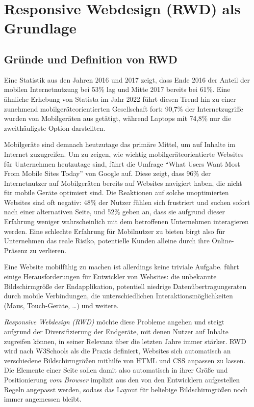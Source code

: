 \section{Responsive Webdesign (RWD) als Grundlage}\label{sec:responsive-webdesign-rwd-als-grundlage}

\subsection{Gründe und Definition von RWD}\label{subsec:grunde-und-definition-von-rwd}

Eine Statistik aus den Jahren 2016 und 2017 \autocite{statista.GWI.2017} zeigt, dass Ende 2016 der Anteil der mobilen Internetnutzung bei 53\% lag und Mitte 2017 bereits bei 61\%.
Eine ähnliche Erhebung von Statista \autocite{statista.DataReportal.WeAreSocial.Hootsuite.2023} im Jahr 2022 führt diesen Trend hin zu einer zunehmend mobilgeräteorientierten Gesellschaft fort:
90,7\% der Internetzugriffe wurden von Mobilgeräten aus getätigt, während Laptops mit 74,8\% nur die zweithäufigste Option darstellten.

Mobilgeräte sind demnach heutzutage das primäre Mittel, um auf Inhalte im Internet zuzugreifen.
Um zu zeigen, wie wichtig mobilgeräteorientierte Websites für Unternehmen heutzutage sind, führt \autocite[S. 25]{Harmsen.2018} die Umfrage "`What Users Want Most From Mobile Sites Today"' von Google \autocite{Google.WhatUsersWantFromMobile.2012} auf.
Diese zeigt, dass 96\% der Internetnutzer auf Mobilgeräten bereits auf Websites navigiert haben, die nicht für mobile Geräte optimiert sind.
Die Reaktionen auf solche unoptimierten Websites sind oft negativ: 48\% der Nutzer fühlen sich frustriert und suchen sofort nach einer alternativen Seite, und 52\% geben an, dass sie aufgrund dieser Erfahrung weniger wahrscheinlich mit dem betroffenen Unternehmen interagieren werden.
Eine schlechte Erfahrung für Mobilnutzer zu bieten birgt also für Unternehmen das reale Risiko, potentielle Kunden alleine durch ihre Online-Präsenz zu verlieren.

Eine Website mobilfähig zu machen ist allerdings keine triviale Aufgabe.
\autocite[S. 25-33]{Harmsen.2018} führt einige Herausforderungen für Entwickler von Websites:
die unbekannte Bildschirmgröße der Endapplikation, potentiell niedrige Datenübertragungsraten durch mobile Verbindungen, die unterschiedlichen Interaktionsmöglichkeiten (Maus, Touch-Geräte, \ldots) und weitere.

\emph{Responsive Webdesign (RWD)} möchte diese Probleme angehen und steigt aufgrund der Diversifizierung der Endgeräte, mit denen Nutzer auf Inhalte zugreifen können, in seiner Relevanz über die letzten Jahre immer stärker.
RWD wird nach W3Schools \autocite{W3Schools.ResponsiveWebDesign.2024} als die Praxis definiert, Websites sich automatisch an verschiedene Bildschirmgrößen mithilfe von HTML und CSS anpassen zu lassen.
Die Elemente einer Seite sollen damit also automatisch in ihrer Größe und Positionierung \emph{vom Browser} implizit aus den von den Entwicklern aufgestellen Regeln angepasst werden, sodass das Layout für beliebige Bildschirmgrößen noch immer angemessen bleibt.

